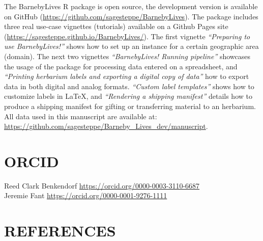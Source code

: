 \documentclass[
]{article}
\begin{document}
The BarnebyLives R package is open source, the development version is
available on GitHub (\url{https://github.com/sagesteppe/BarnebyLives}).
The package includes three real use-case vignettes (tutorials) available
on a Github Pages site
(\url{https://sagesteppe.github.io/BarnebyLives/}). The first vignette
\emph{``Preparing to use BarnebyLives!''} shows how to set up an
instance for a certain geographic area (domain). The next two vignettes
\emph{``BarnebyLives! Running pipeline''} showcases the usage of the
package for processing data entered on a spreadsheet, and
\emph{``Printing herbarium labels and exporting a digital copy of
data''} how to export data in both digital and analog formats.
\emph{``Custom label templates''} shows how to customize labels in
LaTeX, and \emph{``Rendering a shipping manifest''} details how to
produce a shipping manifest for gifting or transferring material to an
herbarium. All data used in this manuscript are available at:
\url{https://github.com/sagesteppe/Barneby_Lives_dev/manuscript}.

\singlespacing

\section{ORCID}\label{orcid}

Reed Clark Benkendorf \url{https://orcid.org/0000-0003-3110-6687}\\
Jeremie Fant \url{https://orcid.org/0000-0001-9276-1111}

\small

\section{REFERENCES}\label{references}

\clearpage
\end{document}
